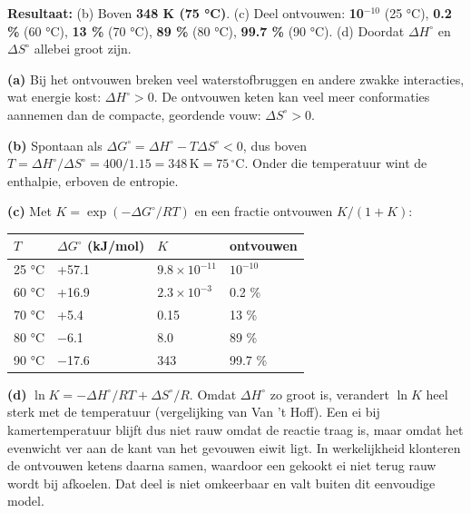 \begin{oplossing}
\textbf{Resultaat:} (b) Boven \textbf{348 K (75 °C)}. (c) Deel ontvouwen: \textbf{10\ensuremath{^{-10}}} (25 °C), \textbf{0.2 \%} (60 °C), \textbf{13 \%} (70 °C), \textbf{89 \%} (80 °C), \textbf{99.7 \%} (90 °C). (d) Doordat \(\Delta H^\circ\) en \(\Delta S^\circ\) allebei groot zijn.

\textbf{(a)} Bij het ontvouwen breken veel waterstofbruggen en andere zwakke interacties, wat energie kost: \(\Delta H^\circ > 0\). De ontvouwen keten kan veel meer conformaties aannemen dan de compacte, geordende vouw: \(\Delta S^\circ > 0\).

\textbf{(b)} Spontaan als \(\Delta G^\circ = \Delta H^\circ - T\Delta S^\circ < 0\), dus boven \(T = \Delta H^\circ/\Delta S^\circ = 400/1.15 = 348\,\mathrm{K} = 75\,^\circ\mathrm{C}\). Onder die temperatuur wint de enthalpie, erboven de entropie.

\textbf{(c)} Met \(K = \exp(-\Delta G^\circ/RT)\) en een fractie ontvouwen \(K/(1+K)\):

\begin{center}
\begin{tabular}{llll}
\toprule
\(T\) & \(\Delta G^\circ\) (kJ/mol) & \(K\) & ontvouwen \\
\midrule
25 °C & +57.1 & \(9.8\times10^{-11}\) & \(10^{-10}\) \\
60 °C & +16.9 & \(2.3\times10^{-3}\) & 0.2 \% \\
70 °C & +5.4 & 0.15 & 13 \% \\
80 °C & \ensuremath{-}6.1 & 8.0 & 89 \% \\
90 °C & \ensuremath{-}17.6 & 343 & 99.7 \% \\
\bottomrule
\end{tabular}
\end{center}

\textbf{(d)} \(\ln K = -\Delta H^\circ/RT + \Delta S^\circ/R\). Omdat \(\Delta H^\circ\) zo groot is, verandert \(\ln K\) heel sterk met de temperatuur (vergelijking van Van 't Hoff). Een ei bij kamertemperatuur blijft dus niet rauw omdat de reactie traag is, maar omdat het evenwicht ver aan de kant van het gevouwen eiwit ligt. In werkelijkheid klonteren de ontvouwen ketens daarna samen, waardoor een gekookt ei niet terug rauw wordt bij afkoelen. Dat deel is niet omkeerbaar en valt buiten dit eenvoudige model.
\end{oplossing}

